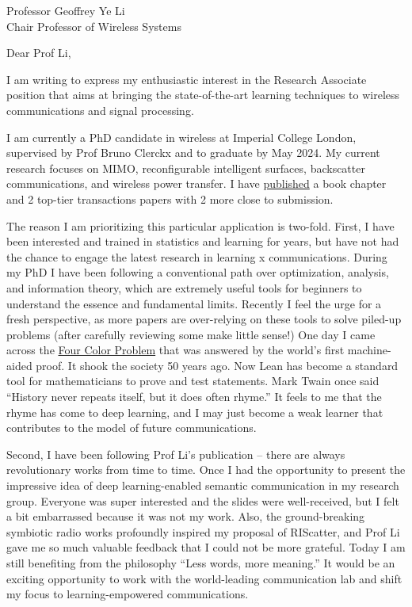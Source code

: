 \documentclass[10pt]{scrartcl}
\begin{document}

\begin{letter}{%
		Professor Geoffrey Ye Li\\
		Chair Professor of Wireless Systems
	}
	\opening{Dear Prof Li,}
	I am writing to express my enthusiastic interest in the Research Associate position that aims at bringing the state-of-the-art learning techniques to wireless communications and signal processing.

	I am currently a PhD candidate in wireless at Imperial College London, supervised by Prof Bruno Clerckx and to graduate by May 2024.
	My current research focuses on MIMO, reconfigurable intelligent surfaces, backscatter communications, and wireless power transfer.
	I have \href{https://scholar.google.co.uk/citations?user=ckmF3VsAAAAJ&hl=en}{published} a book chapter and 2 top-tier transactions papers with 2 more close to submission.

	The reason I am prioritizing this particular application is two-fold.
	First, I have been interested and trained in statistics and learning for years, but have not had the chance to engage the latest research in learning x communications.
	During my PhD I have been following a conventional path over optimization, analysis, and information theory, which are extremely useful tools for beginners to understand the essence and fundamental limits.
	Recently I feel the urge for a fresh perspective, as more papers are over-relying on these tools to solve piled-up problems (after carefully reviewing some make little sense!)
	One day I came across the \href{https://en.wikipedia.org/wiki/Four_color_theorem}{Four Color Problem} that was answered by the world's first machine-aided proof.
	It shook the society 50 years ago.
	Now Lean has become a standard tool for mathematicians to prove and test statements.
	Mark Twain once said ``History never repeats itself, but it does often rhyme.''
	It feels to me that the rhyme has come to deep learning, and I may just become a weak learner that contributes to the model of future communications.

	Second, I have been following Prof Li's publication -- there are always revolutionary works from time to time.
	Once I had the opportunity to present the impressive idea of deep learning-enabled semantic communication in my research group.
	Everyone was super interested and the slides were well-received, but I felt a bit embarrassed because it was not my work.
	Also, the ground-breaking symbiotic radio works profoundly inspired my proposal of RIScatter, and Prof Li gave me so much valuable feedback that I could not be more grateful.
	Today I am still benefiting from the philosophy ``Less words, more meaning.''
	It would be an exciting opportunity to work with the world-leading communication lab and shift my focus to learning-empowered communications.


\end{letter}
\end{document}
